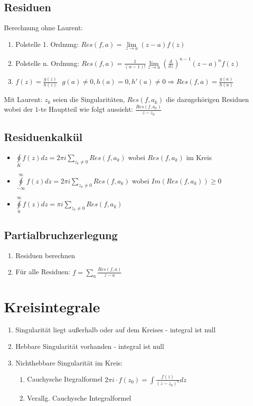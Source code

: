 \documentclass[10pt,a4paper]{article}
\begin{document}
\subsection{Residuen}
Berechnung ohne Laurent:
\begin{enumerate}
\item Polstelle 1. Ordnung: $Res(f,a) = \lim\limits_{z\rightarrow a} (z-a)f(z)$
\item Polstelle n. Ordnung: $Res(f,a) = \frac{1}{(n-1)!} \lim\limits_{z\rightarrow a} \left(\frac{d}{dz}\right)^{n-1} (z-a)^n f(z)$
\item $f(z)=\frac{g(z)}{h(z)} \,\,\,\, g(a) \neq 0, h(a) = 0, h'(a)\neq 0 \Rightarrow Res(f,a)=\frac{g(a)}{h(a)}$
\end{enumerate}

Mit Laurent:
$z_k$ seien die Singularitäten, $Res(f, a_k)$ die dazugehörigen Residuen wobei der $1$-te Hauptteil wie folgt aussieht: $\frac{Res(f, a_k)}{z-z_0}$

\subsection{Residuenkalkül}
\begin{itemize}
\item $\oint\limits_{K} f(z) dz = 2 \pi i \sum\limits_{z_k \neq 0} Res(f, a_k)$ wobei $Res(f, a_k)$ im Kreis
\item $\oint\limits_{-\infty}^{\infty} f(z) dz = 2 \pi i \sum\limits_{z_k \neq 0} Res(f, a_k)$ wobei $Im(Res(f, a_k)) \geq 0$
\item $\oint\limits_{0}^{\infty} f(z) dz = \pi i \sum\limits_{z_k \neq 0} Res(f, a_k)$
\end{itemize}

\subsection{Partialbruchzerlegung}
\begin{enumerate}
\item Residuen berechnen
\item Für alle Residuen: $f = \sum\limits_a \frac{Res(f, a)}{z-a}$
\end{enumerate}

\section{Kreisintegrale}
\begin{enumerate}
 \item Singularität liegt außerhalb oder auf dem Kreises - integral ist null
 \item Hebbare Singularität vorhanden - integral ist null
 \item Nichthebbare Singularität im Kreis:
 \begin{enumerate}
  \item Cauchysche Itegralformel $2 \pi i \cdot f(z_0) = \int \frac{f(z)}{(z-z_0)^n} dz$
  \item Verallg. Cauchysche Integralformel
 \end{enumerate}
\end{enumerate}
\end{document}
